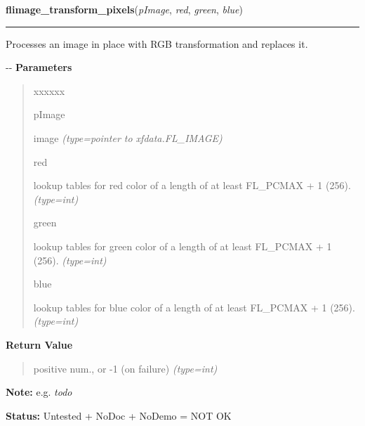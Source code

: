     \vspace{0.5ex}

\hspace{.8\funcindent}\begin{boxedminipage}{\funcwidth}

    \raggedright \textbf{flimage\_transform\_pixels}(\textit{pImage}, \textit{red}, \textit{green}, \textit{blue})

    \vspace{-1.5ex}

    \rule{\textwidth}{0.5\fboxrule}
\setlength{\parskip}{2ex}

Processes an image in place with RGB transformation and replaces it.

-{}-
\setlength{\parskip}{1ex}
      \textbf{Parameters}
      \vspace{-1ex}

      \begin{quote}
        \begin{Ventry}{xxxxxx}

          \item[pImage]


image
            {\it (type=pointer to xfdata.FL\_IMAGE)}

          \item[red]


lookup tables for red color of a length of at least FL\_PCMAX + 1 (256).
            {\it (type=int)}

          \item[green]


lookup tables for green color of a length of at least FL\_PCMAX + 1
(256).
            {\it (type=int)}

          \item[blue]


lookup tables for blue color of a length of at least FL\_PCMAX + 1
(256).
            {\it (type=int)}

        \end{Ventry}

      \end{quote}

      \textbf{Return Value}
    \vspace{-1ex}

      \begin{quote}

positive num., or -1 (on failure)
      {\it (type=int)}

      \end{quote}

\textbf{Note:} 
e.g. \emph{todo}


\textbf{Status:} 
Untested + NoDoc + NoDemo = NOT OK


    \end{boxedminipage}

